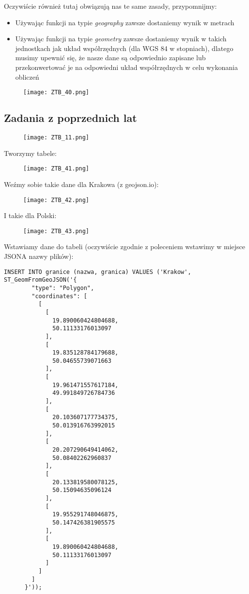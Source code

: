 \documentclass[a4paper,15pt]{article}
\newcommand{\egz}[2]{
    \begin{tcolorbox}[colback=mRed!5!white,colframe=mRed,title={Egzamin #1}]
        #2
    \end{tcolorbox}
}
\newcommand{\example}[2]{
    \begin{tcolorbox}[colback=blue!5!white,colframe=blue,title={Przykład #1}]
        #2
    \end{tcolorbox}
}
\begin{document}
Oczywiście również tutaj obwiązują nas te same zasady, przypomnijmy:

\begin{itemize}
\item Używając funkcji na typie \textit{geography} zawsze dostaniemy wynik w metrach
\item Używając funkcji na typie \textit{geometry} zawsze dostaniemy wynik w takich jednostkach jak układ współrzędnych (dla WGS 84 w stopniach), dlatego musimy upewnić się, że nasze dane są odpowiednio zapisane lub przekonwertować je na odpowiedni układ współrzędnych w celu wykonania obliczeń
\end{itemize}
 
 
\example{}{
\begin{figure}[H]
\centering
  \texttt{[image: ZTB\_40.png]}
\end{figure}
}


\newpage
\subsection{Zadania z poprzednich lat}
\egz{}{
\begin{figure}[H]
\centering
  \texttt{[image: ZTB\_11.png]}
\end{figure}
}

Tworzymy tabele:
\begin{figure}[H]
\centering
  \texttt{[image: ZTB\_41.png]}
\end{figure}

Weźmy sobie takie dane dla Krakowa (z geojson.io):

\begin{figure}[H]
\centering
  \texttt{[image: ZTB\_42.png]}
\end{figure}

I takie dla Polski:

\begin{figure}[H]
\centering
  \texttt{[image: ZTB\_43.png]}
\end{figure}

Wstawiamy dane do tabeli (oczywiście zgodnie z poleceniem wstawimy w miejsce JSONA  nazwy plików):

\begin{lstlisting}
INSERT INTO granice (nazwa, granica) VALUES ('Krakow', ST_GeomFromGeoJSON('{
        "type": "Polygon",
        "coordinates": [
          [
            [
              19.890060424804688,
              50.11133176013097
            ],
            [
              19.835128784179688,
              50.04655739071663
            ],
            [
              19.961471557617184,
              49.991849726784736
            ],
            [
              20.103607177734375,
              50.013916763992015
            ],
            [
              20.207290649414062,
              50.08402262960837
            ],
            [
              20.133819580078125,
              50.15094635096124
            ],
            [
              19.955291748046875,
              50.147426381905575
            ],
            [
              19.890060424804688,
              50.11133176013097
            ]
          ]
        ]
      }'));
\end{lstlisting}
\end{document}
